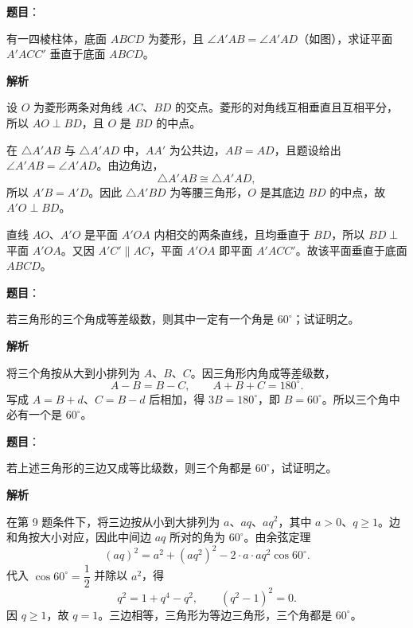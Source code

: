 \begin{answer}

\textbf{题目}：

有一四棱柱体，底面 $ABCD$ 为菱形，且
$\angle A'AB=\angle A'AD$（如图），求证平面 $A'ACC'$ 垂直于底面 $ABCD$。
\nopagebreak[4]
\begin{center}\end{center}
\nopagebreak[4]
\textbf{解析}
\nopagebreak[4]
\begin{center}\end{center}
\nopagebreak[4]
设 $O$ 为菱形两条对角线 $AC$、$BD$ 的交点。菱形的对角线互相垂直且互相平分，所以 $AO\perp BD$，且 $O$ 是 $BD$ 的中点。

在 $\triangle A'AB$ 与 $\triangle A'AD$ 中，$AA'$ 为公共边，$AB=AD$，且题设给出 $\angle A'AB=\angle A'AD$。由边角边，
\nopagebreak[4]
\[
\triangle A'AB\cong\triangle A'AD,
\]
所以 $A'B=A'D$。因此 $\triangle A'BD$ 为等腰三角形，$O$ 是其底边 $BD$ 的中点，故 $A'O\perp BD$。

直线 $AO$、$A'O$ 是平面 $A'OA$ 内相交的两条直线，且均垂直于 $BD$，所以 $BD\perp$ 平面 $A'OA$。又因 $A'C'\parallel AC$，平面 $A'OA$ 即平面 $A'ACC'$。故该平面垂直于底面 $ABCD$。


\end{answer}
\begin{answer}

\textbf{题目}：

若三角形的三个角成等差级数，则其中一定有一个角是 $60^\circ$；试证明之。

\textbf{解析}

将三个角按从大到小排列为 $A$、$B$、$C$。因三角形内角成等差级数，
\nopagebreak[4]
\[
A-B=B-C,\qquad A+B+C=180^\circ.
\]
写成 $A=B+d$、$C=B-d$ 后相加，得 $3B=180^\circ$，即 $B=60^\circ$。所以三个角中必有一个是 $60^\circ$。


\end{answer}
\begin{answer}

\textbf{题目}：

若上述三角形的三边又成等比级数，则三个角都是 $60^\circ$，试证明之。

\textbf{解析}

在第 9 题条件下，将三边按从小到大排列为 $a$、$aq$、$aq^2$，其中 $a>0$、$q\geqslant1$。边和角按大小对应，因此中间边 $aq$ 所对的角为 $60^\circ$。由余弦定理
\nopagebreak[4]
\[
(aq)^2=a^2+(aq^2)^2-2\cdot a\cdot aq^2\cos60^\circ.
\]
代入 $\cos60^\circ=\dfrac12$ 并除以 $a^2$，得
\nopagebreak[4]
\[
q^2=1+q^4-q^2,
\qquad (q^2-1)^2=0.
\]
因 $q\geqslant1$，故 $q=1$。三边相等，三角形为等边三角形，三个角都是 $60^\circ$。


\end{answer}